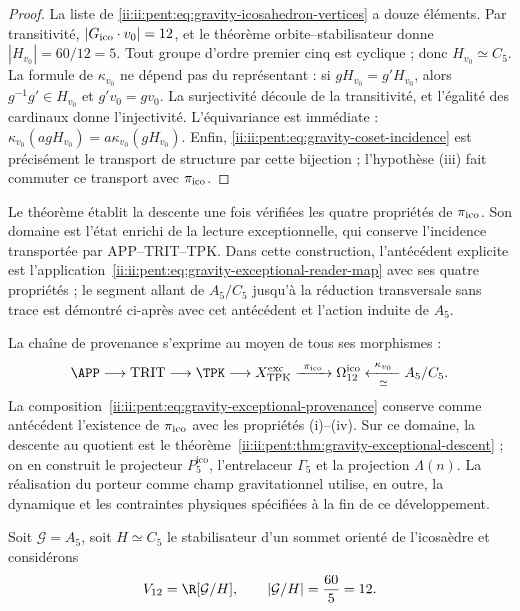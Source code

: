 \begin{proof}
La liste de \eqref{ii:ii:pent:eq:gravity-icosahedron-vertices} a douze éléments.
Par transitivité, \(|G_{\rm ico}\cdot v_0|=12\), et le théorème
orbite--stabilisateur donne \(|H_{v_0}|=60/12=5\). Tout groupe d’ordre
premier cinq est cyclique ; donc \(H_{v_0}\simeq C_5\). La formule de
\(\kappa_{v_0}\) ne dépend pas du représentant : si
\(gH_{v_0}=g'H_{v_0}\), alors \(g^{-1}g'\in H_{v_0}\) et
\(g'v_0=gv_0\). La surjectivité découle de la transitivité, et
l’égalité des cardinaux donne l’injectivité. L’équivariance est immédiate :
\(\kappa_{v_0}(agH_{v_0})=a\kappa_{v_0}(gH_{v_0})\). Enfin,
\eqref{ii:ii:pent:eq:gravity-coset-incidence} est précisément le transport de
structure par cette bijection ; l’hypothèse (iii) fait commuter ce
transport avec \(\pi_{\rm ico}\).
\end{proof}

Le théorème établit la descente une fois vérifiées les quatre
propriétés de \(\pi_{\rm ico}\). Son domaine est l’état enrichi
de la lecture exceptionnelle, qui conserve l’incidence transportée par
APP--TRIT--TPK. Dans cette construction, l’antécédent explicite est
l’application~\eqref{ii:ii:pent:eq:gravity-exceptional-reader-map} avec ses quatre
propriétés ; le segment allant de \(A_5/C_5\) jusqu’à la réduction transversale sans
trace est démontré ci-après avec cet antécédent et l’action induite
de \(A_5\).

La chaîne de provenance s’exprime au moyen de tous ses morphismes :
\begin{equation}
\label{ii:ii:pent:eq:gravity-exceptional-provenance}
\APP\longrightarrow\mathrm{TRIT}\longrightarrow\TPK
\longrightarrow X_{\rm TPK}^{\rm exc}
\xrightarrow{\ \pi_{\rm ico}\ }\Omega_{12}^{\rm ico}
\xleftarrow[\simeq]{\ \kappa_{v_0}\ }A_5/C_5.
\end{equation}
La composition~\eqref{ii:ii:pent:eq:gravity-exceptional-provenance} conserve
comme antécédent l’existence de \(\pi_{\rm ico}\) avec les propriétés
(i)--(iv). Sur ce domaine, la descente au quotient est le
théorème~\ref{ii:ii:pent:thm:gravity-exceptional-descent} ; on en construit
le projecteur \(P^{\mathrm{ico}}_5\), l’entrelaceur \(\Gamma_5\) et la
projection \(\Lambda(n)\). La réalisation du porteur comme champ
gravitationnel utilise, en outre, la dynamique et les contraintes physiques
spécifiées à la fin de ce développement.

Soit \(\mathcal G=A_5\), soit \(H\simeq C_5\) le stabilisateur d’un sommet
orienté de l’icosaèdre et considérons
\begin{equation}
\label{ii:ii:pent:eq:gravity-v12}
V_{12}=\R[\mathcal G/H],
\qquad |\mathcal G/H|=\frac{60}{5}=12.
\end{equation}


